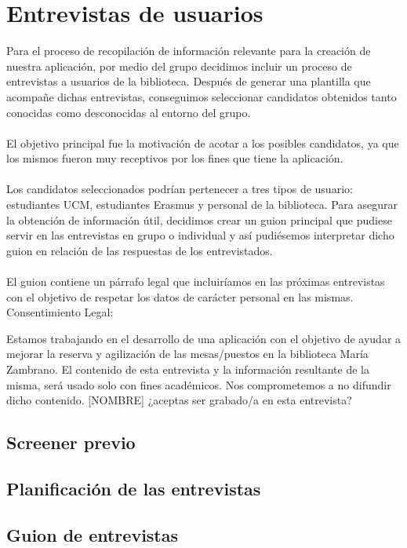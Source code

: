 \documentclass[12pt]{article}
\begin{document}
\section{Entrevistas de usuarios}
Para el proceso de recopilación de información relevante para la creación de nuestra aplicación, por medio del grupo decidimos incluir un proceso de entrevistas a usuarios de la biblioteca. Después de generar una plantilla que acompañe dichas entrevistas, conseguimos seleccionar candidatos obtenidos tanto conocidas como desconocidas al entorno del grupo.
\\
\\
El objetivo principal fue la motivación de acotar a los posibles candidatos, ya que los mismos fueron muy receptivos por los fines que tiene la aplicación. 
\\
\\
Los candidatos seleccionados podrían pertenecer a tres tipos de usuario: estudiantes UCM, estudiantes Erasmus y personal de la biblioteca. Para asegurar la obtención de información útil, decidimos crear un guion principal que pudiese servir en las entrevistas en grupo o individual y así pudiésemos interpretar dicho guion en relación de las respuestas de los entrevistados.
\\
\\
El guion contiene un párrafo legal que incluiríamos en las próximas entrevistas con el objetivo de respetar los datos de carácter personal en las mismas.
\newpage
Consentimiento Legal:
\begin{mdframed}
         Estamos trabajando en el desarrollo de una aplicación con el objetivo de ayudar a mejorar la reserva y agilización de las mesas/puestos en la biblioteca María Zambrano. 
             El contenido de esta entrevista y la información resultante de la misma, será usado solo con fines académicos.
             Nos comprometemos a no difundir dicho contenido. 
[NOMBRE] ¿aceptas ser grabado/a en esta entrevista?
\end{mdframed}

\subsection{Screener previo}
\subsection{Planificación de las entrevistas}
\subsection{Guion de entrevistas}
\end{document}
